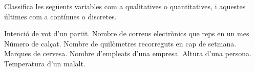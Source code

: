 	\begin{mylist}
		\exer \mental Classifica les següents variables com a qualitatives o quantitatives, i aquestes últimes com a contínues o discretes. 
		\begin{tasks}
			\task Intenció de vot d'un partit. \hspace{0.25cm}\dotfill\hspace{1cm}
			\task Nombre de correus electrònics que reps en un mes. \hspace{0.25cm}\dotfill\hspace{1cm}
			\task Número de calçat. \hspace{0.25cm}\dotfill\hspace{1cm}
			\task Nombre de quilòmetres recorreguts en cap de setmana. \hspace{0.25cm}\dotfill\hspace{1cm}
			\task Marques de cervesa. \hspace{0.25cm}\dotfill\hspace{1cm}
			\task Nombre d'empleats d'una empresa. \hspace{0.25cm}\dotfill\hspace{1cm}
			\task Altura d'una persona. \hspace{0.25cm}\dotfill\hspace{1cm}
			\task Temperatura d'un malalt. \hspace{0.25cm}\dotfill\hspace{1cm}
		\end{tasks}

	\end{mylist}


